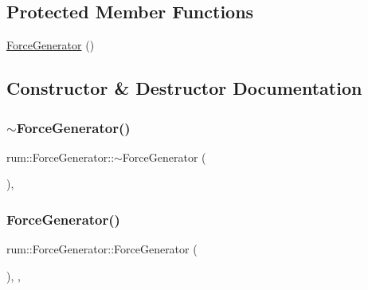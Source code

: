 \subsection*{Protected Member Functions}
\begin{DoxyCompactItemize}
\item 
\mbox{\hyperlink{classrum_1_1_force_generator_aa96fa405b09b0f608c42b8c1db971c7c}{Force\+Generator}} ()
\end{DoxyCompactItemize}


\subsection{Constructor \& Destructor Documentation}
\mbox{\label{classrum_1_1_force_generator_a9b332008be5cec3cdef03fa03077a54e}} 
\subsubsection{\texorpdfstring{$\sim$\+Force\+Generator()}{~ForceGenerator()}}
{\footnotesize\ttfamily rum\+::\+Force\+Generator\+::$\sim$\+Force\+Generator (\begin{DoxyParamCaption}{ }\end{DoxyParamCaption})\hspace{0.3cm}{\ttfamily [virtual]}, {\ttfamily [default]}}

\mbox{\label{classrum_1_1_force_generator_aa96fa405b09b0f608c42b8c1db971c7c}} 
\subsubsection{\texorpdfstring{Force\+Generator()}{ForceGenerator()}}
{\footnotesize\ttfamily rum\+::\+Force\+Generator\+::\+Force\+Generator (\begin{DoxyParamCaption}{ }\end{DoxyParamCaption})\hspace{0.3cm}{\ttfamily [explicit]}, {\ttfamily [protected]}, {\ttfamily [default]}}



